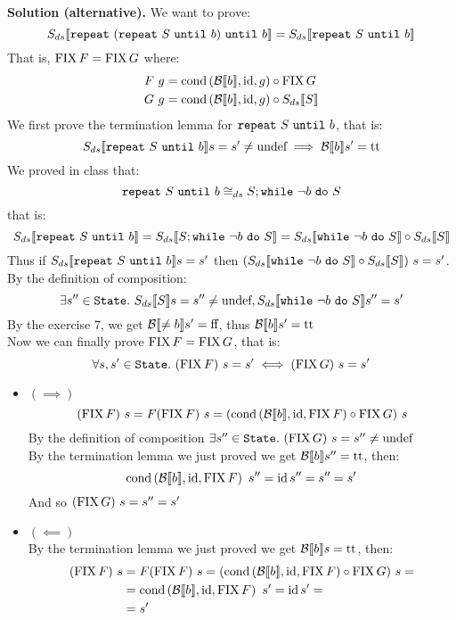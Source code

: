 \par\medskip\noindent \textbf{Solution (alternative).} \rmfamily
We want to prove:
\[ \Sds{\wrepeat{(\wrepeat{S}{b})}{b}} = \Sds{\wrepeat{S}{b}} \]
That is, $\FIX F = \FIX G$ where:
\begin{align*}
    F\ g &= \cond{\Bool{b}}{\id}{g} \circ \FIX G \\
    G\ g &= \cond{\Bool{b}}{\id}{g} \circ \Sds{S}
\end{align*}
We first prove the termination lemma for $\wrepeat{S}{b}$, that is:
\[ \Sds{\wrepeat{S}{b}} s = s' \neq \undef \implies \Bool{b} s' = \True \]
We proved in class that:
\[ \wrepeat{S}{b} \DScong S;\wwhile{\neg b}{S} \]
that is:
\[ \Sds{\wrepeat{S}{b}} = \Sds{S;\wwhile{\neg b}{S}} = \Sds{\wwhile{\neg b}{S}} \circ \Sds{S} \]
Thus if $\Sds{\wrepeat{S}{b}} s = s'$ then $(\Sds{\wwhile{\neg b}{S}} \circ \Sds{S})\ s = s'$. \\
By the definition of composition:
\[ \exists s'' \in \State.\ \Sds{S} s = s'' \neq \undef, \Sds{\wwhile{\neg b}{S}} s'' = s' \]
By the exercise 7, we get $\Bool{\neq b} s' = \False$, thus $\Bool{b} s' = \True$ \\
Now we can finally prove $\FIX F = \FIX G$, that is:
\[ \forall s, s' \in \State.\ (\FIX F)\ s = s' \iff (\FIX G)\ s = s' \]
\begin{itemize}
    \item $(\implies)$
        \[ (\FIX F)\ s = F(\FIX F)\ s = (\cond{\Bool{b}}{\id}{\FIX F} \circ \FIX G)\ s \]
        By the definition of composition $\exists s'' \in \State.\ (\FIX G)\ s = s'' \neq \undef$ \\
        By the termination lemma we just proved we get $\Bool{b} s'' = \True$, then:
        \[ \cond{\Bool{b}}{\id}{\FIX F}\ s'' = \id s'' = s'' = s' \]
        And so $(\FIX G)\ s = s'' = s'$
    \item $(\impliedby)$ \\
        By the termination lemma we just proved we get $\Bool{b} s = \True$, then:
        \begin{align*}
            (\FIX F)\ s &= F(\FIX F)\ s = (\cond{\Bool{b}}{\id}{\FIX F} \circ \FIX G)\ s = \\
            &= \cond{\Bool{b}}{\id}{\FIX F}\ s' = \id s' = \\
            &= s'
        \end{align*}
\end{itemize}
